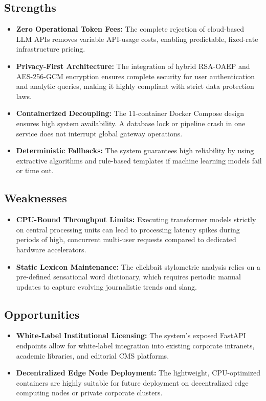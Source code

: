 \subsection{Strengths}
\begin{itemize}
    \item \textbf{Zero Operational Token Fees:} The complete rejection of cloud-based LLM APIs removes variable API-usage costs, enabling predictable, fixed-rate infrastructure pricing.
    \item \textbf{Privacy-First Architecture:} The integration of hybrid RSA-OAEP and AES-256-GCM encryption ensures complete security for user authentication and analytic queries, making it highly compliant with strict data protection laws.
    \item \textbf{Containerized Decoupling:} The 11-container Docker Compose design ensures high system availability. A database lock or pipeline crash in one service does not interrupt global gateway operations.
    \item \textbf{Deterministic Fallbacks:} The system guarantees high reliability by using extractive algorithms and rule-based templates if machine learning models fail or time out.
\end{itemize}

\subsection{Weaknesses}
\begin{itemize}
    \item \textbf{CPU-Bound Throughput Limits:} Executing transformer models strictly on central processing units can lead to processing latency spikes during periods of high, concurrent multi-user requests compared to dedicated hardware accelerators.
    \item \textbf{Static Lexicon Maintenance:} The clickbait stylometric analysis relies on a pre-defined sensational word dictionary, which requires periodic manual updates to capture evolving journalistic trends and slang.
\end{itemize}

\subsection{Opportunities}
\begin{itemize}
    \item \textbf{White-Label Institutional Licensing:} The system's exposed FastAPI endpoints allow for white-label integration into existing corporate intranets, academic libraries, and editorial CMS platforms.
    \item \textbf{Decentralized Edge Node Deployment:} The lightweight, CPU-optimized containers are highly suitable for future deployment on decentralized edge computing nodes or private corporate clusters.
\end{itemize}


